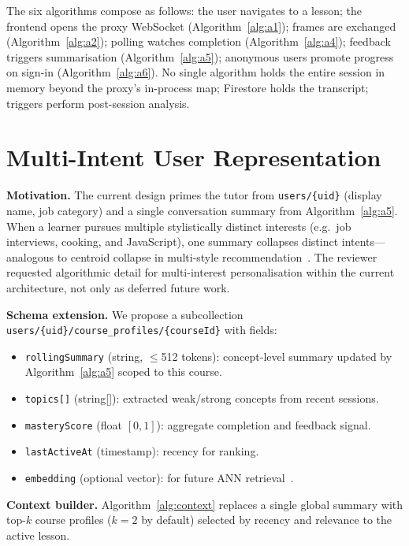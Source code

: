 The six algorithms compose as follows: the user navigates to a lesson; the frontend opens the proxy WebSocket (Algorithm~\ref{alg:a1}); frames are exchanged (Algorithm~\ref{alg:a2}); polling watches completion (Algorithm~\ref{alg:a4}); feedback triggers summarisation (Algorithm~\ref{alg:a5}); anonymous users promote progress on sign-in (Algorithm~\ref{alg:a6}). No single algorithm holds the entire session in memory beyond the proxy's in-process map; Firestore holds the transcript; triggers perform post-session analysis.

\section{Multi-Intent User Representation}
\label{sec:multi-intent}

\textbf{Motivation.} The current design primes the tutor from \texttt{users/\{uid\}} (display name, job category) and a single conversation summary from Algorithm~\ref{alg:a5}. When a learner pursues multiple stylistically distinct interests (e.g.\ job interviews, cooking, and JavaScript), one summary collapses distinct intents---analogous to centroid collapse in multi-style recommendation~\cite{anh2026mmr}. The reviewer requested algorithmic detail for multi-interest personalisation within the current architecture, not only as deferred future work.

\textbf{Schema extension.} We propose a subcollection \texttt{users/\{uid\}/course\_profiles/\{courseId\}} with fields:
\begin{itemize}
    \item \texttt{rollingSummary} (string, $\leq$512 tokens): concept-level summary updated by Algorithm~\ref{alg:a5} scoped to this course.
    \item \texttt{topics[]} (string[]): extracted weak/strong concepts from recent sessions.
    \item \texttt{masteryScore} (float $[0,1]$): aggregate completion and feedback signal.
    \item \texttt{lastActiveAt} (timestamp): recency for ranking.
    \item \texttt{embedding} (optional vector): for future ANN retrieval~\cite{malkov2018hnsw}.
\end{itemize}

\textbf{Context builder.} Algorithm~\ref{alg:context} replaces a single global summary with top-$k$ course profiles ($k=2$ by default) selected by recency and relevance to the active lesson.

